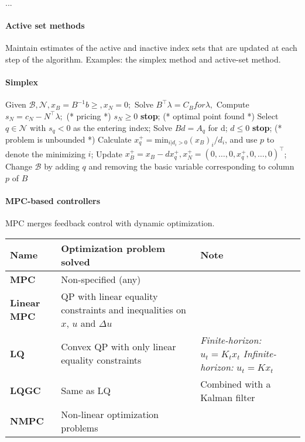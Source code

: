 
...

\sepline

\paragraph{Active set methods} Maintain estimates of the active and inactive index sets
that are updated at each step of the algorithm. Examples: the simplex method and active-set method.

\paragraph{Simplex}

\begin{codebox}
\li Given $\mathcal{B}, \mathcal{N}, x_B = B^{-1}b \geq, x_N = 0;$
\li Solve $B^\top \lambda = C_B for \lambda,$
\li Compute $s_N = c_N - N^\top \lambda;$ (* pricing *)
\li \If $s_N \geq 0$ \Indentmore
\li \textbf{stop}; (* optimal point found *) \End
\li Select $q \in \mathcal{N}$ with $s_q < 0$ as the entering index;
\li Solve $Bd = A_q$ for d;
\li \If $d \leq 0$ \Indentmore
\li \textbf{stop}; (* problem is unbounded *) \End
\li Calculate $x_q^+ = \text{min}_{i | d_i > 0} (x_B)_i/d_i$, and use $p$ to
\zi denote the minimizing $i$;
\li Update $x_B^+ = x_B - dx_q^+, x_N^+ = (0, \dots, 0, x_q^+, 0, \dots, 0)^\top$;
\li Change $\mathcal{B}$ by adding $q$ and removing the basic
\zi variable corresponding to column $p$ of $B$
\end{codebox}
%
\paragraph{MPC-based controllers} MPC merges feedback control with dynamic optimization.

\begin{tabularx}{\linewidth}{p{1.3cm} X X}
	\textbf{Name} & \textbf{Optimization problem solved} & \textbf{Note}\\
	\hline
	\textbf{MPC} & Non-specified (any) & \\
	\textbf{Linear MPC} & QP with linear equality constraints and inequalities on $x$, $u$ and $\Delta u$ & \\
	\textbf{LQ} & Convex QP with only linear equality constraints & \textit{Finite-horizon:} $u_t=K_t x_t$ \textit{Infinite-horizon:} $u_t=K x_t$\\
	\textbf{LQGC} & Same as LQ & Combined with a Kalman filter\\
	\textbf{NMPC} & Non-linear optimization problems &\\
\end{tabularx}

